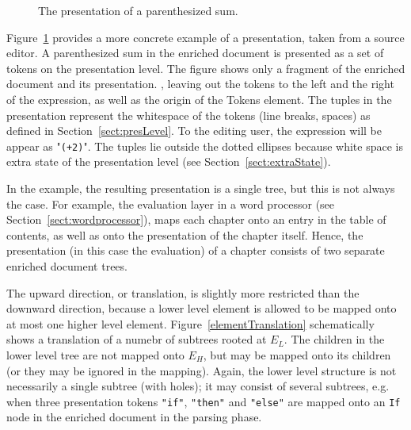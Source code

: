 \begin{figure}
\begin{center}
\begin{center}
%
%
\end{center}
\caption{The presentation of a parenthesized sum.}\label{presentExample} 
\end{center}
\end{figure}

Figure~\ref{presentExample} provides a more concrete example of a presentation, taken from a source editor. A parenthesized sum in the enriched document is presented as a set of tokens on the presentation level. The figure shows only a fragment of the enriched document and its presentation. \bc , leaving out the tokens to the left and the right of the expression, as well as the origin of the Tokens element. \ec The tuples in the presentation represent the whitespace of the tokens (line breaks, spaces) as defined in Section~\ref{sect:presLevel}. To the editing user, the expression will be appear as "{\tt (+2\textvisiblespace )}". The tuples lie outside the dotted ellipses because white space is extra state of the presentation level (see Section~\ref{sect:extraState}). 

\bc
In the example, the resulting presentation is a single tree, but this is not always the case. For example, the evaluation layer in a word processor (see Section~\ref{sect:wordprocessor}), maps each chapter onto an entry in the table of contents, as well as onto the presentation of the chapter itself. Hence, the presentation (in this case the evaluation) of a chapter consists of two separate enriched document trees.
\ec


The upward direction, or translation, is slightly more restricted than the downward direction, because a lower level element is allowed to be mapped onto at most one higher level element. Figure~\ref{elementTranslation} schematically shows a translation of a numebr of subtrees rooted at $E_L$. The children in the lower level tree are not mapped onto $E_H$, but may be mapped onto its children (or they may be ignored in the mapping).  Again, the lower level structure is not necessarily a single subtree (with holes); it may consist of several subtrees, e.g. when three presentation tokens \verb|"if"|, \verb|"then"| and \verb|"else"| are mapped onto an \verb|If| node in the enriched document in the parsing phase.


